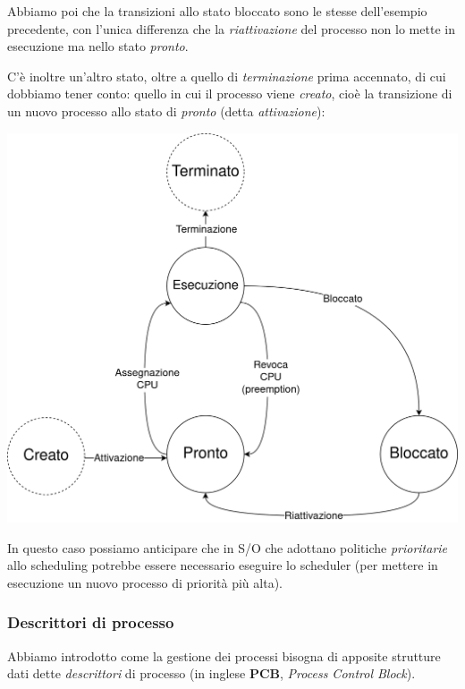 \documentclass[a4paper,11pt]{article}
\begin{document}
Abbiamo poi che la transizioni allo stato bloccato sono le stesse dell'esempio precedente, con l'unica differenza che la \textit{riattivazione} del processo non lo mette in esecuzione ma nello stato \textit{pronto}.

C'è inoltre un'altro stato, oltre a quello di \textit{terminazione} prima accennato, di cui dobbiamo tener conto: quello in cui il processo viene \textit{creato}, cioè la transizione di un nuovo processo allo stato di \textit{pronto} (detta \textit{attivazione}):

\begin{center}
	\includegraphics[scale=0.25]{../figures/proc_creato_esecuzione_pronto_bloccato_terminato.png}
\end{center}

In questo caso possiamo anticipare che in S/O che adottano politiche \textit{prioritarie} allo scheduling potrebbe essere necessario eseguire lo scheduler (per mettere in esecuzione un nuovo processo di priorità più alta).

\subsubsection{Descrittori di processo}
Abbiamo introdotto come la gestione dei processi bisogna di apposite strutture dati dette \textit{descrittori} di processo (in inglese \textbf{PCB}, \textit{Process Control Block}).
\end{document}
